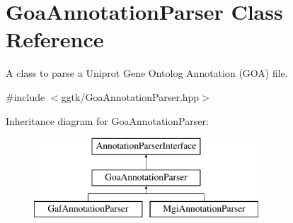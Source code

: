 \hypertarget{classGoaAnnotationParser}{}\section{Goa\+Annotation\+Parser Class Reference}
\label{classGoaAnnotationParser}


A class to parse a Uniprot Gene Ontolog Annotation (G\+OA) file.  




{\ttfamily \#include $<$ggtk/\+Goa\+Annotation\+Parser.\+hpp$>$}

Inheritance diagram for Goa\+Annotation\+Parser\+:\begin{figure}[H]
\begin{center}
\leavevmode
\includegraphics[height=3.000000cm]{classGoaAnnotationParser}
\end{center}
\end{figure}
